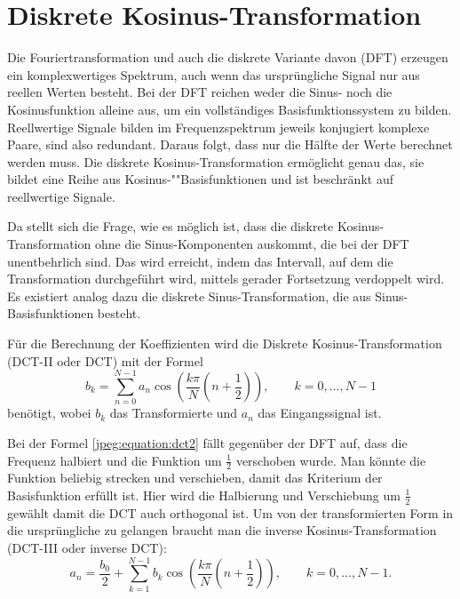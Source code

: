 %
%
%
%
\section{Diskrete Kosinus-Transformation
\label{jpeg:section:dct}}
Die Fouriertransformation und auch die diskrete Variante davon (DFT) erzeugen ein komplexwertiges Spektrum, auch wenn das ursprüngliche Signal nur aus reellen Werten besteht.
Bei der DFT reichen weder die Sinus- noch die Kosinusfunktion alleine aus, um ein vollständiges Basis\-funktions\-system zu bilden.
Reellwertige Signale bilden im Frequenzspektrum jeweils konjugiert komplexe Paare, sind also redundant.
Daraus folgt, dass nur die Hälfte der Werte berechnet werden muss.
Die diskrete Kosinus-Transformation ermöglicht genau das, sie bildet eine Reihe aus Kosinus-""Basisfunktionen und ist beschränkt auf reellwertige Signale.

Da stellt sich die Frage, wie es möglich ist, dass die diskrete Kosinus-Transformation ohne die Sinus-Komponenten auskommt, die bei der DFT unentbehrlich sind.
Das wird erreicht, indem das Intervall, auf dem die Transformation durchgeführt wird, mittels gerader Fortsetzung verdoppelt wird.
Es existiert analog dazu die diskrete Sinus-Transformation, die aus Sinus-Basisfunktionen besteht.

Für die Berechnung der Koeffizienten wird die Diskrete Kosinus-Transformation (DCT-II oder DCT) mit der Formel
\begin{equation}
    b_k
    =
    \sum \limits_{n=0}^{N-1} a_n 
    \cos\left(
        \frac{k\pi}{N}\left(n + \frac{1}{2} \right) 
    \right),
    \qquad k = 0,\dots,N-1
\label{jpeg:equation:dct2}
\end{equation}
benötigt, wobei \(b_k\) das Transformierte und \(a_n\) das Eingangssignal ist.

Bei der Formel \eqref{jpeg:equation:dct2} fällt gegenüber der DFT auf, dass die Frequenz halbiert und die Funktion um \(\frac{1}{2}\) verschoben wurde.
Man könnte die Funktion beliebig strecken und verschieben, damit das Kriterium der Basisfunktion erfüllt ist.
Hier wird die Halbierung und Verschiebung um \(\frac{1}{2}\) gewählt damit die DCT auch orthogonal ist.
Um von der transformierten Form in die ursprüngliche zu gelangen braucht man die inverse Kosinus-Transformation (DCT-III oder inverse DCT):
\begin{equation}
    a_n
    =
    \frac{b_0}{2} +
    \sum \limits_{k=1}^{N-1} b_k 
    \cos\left(
    \frac{k\pi}{N}\left(n + \frac{1}{2} \right) 
    \right),
    \qquad k = 0,\dots,N-1.
    \label{jpeg:equation:dct3}
\end{equation}

